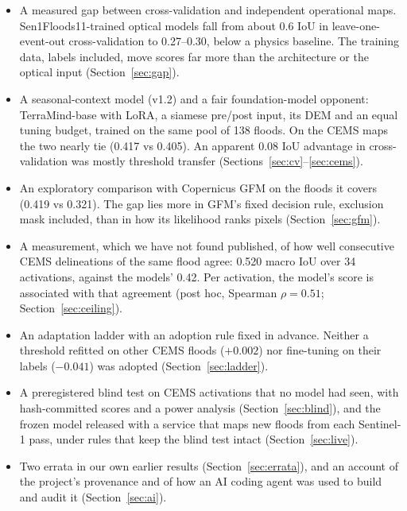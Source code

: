 \documentclass[10pt,twocolumn,a4paper]{article}
\begin{document}
\begin{itemize}
  \item A measured gap between cross-validation and independent operational maps. Sen1Floods11-trained optical models
    fall from about 0.6 IoU in leave-one-event-out cross-validation to 0.27--0.30, below a physics baseline. The
    training data, labels included, move scores far more than the architecture or the optical input
    (Section~\ref{sec:gap}).
  \item A seasonal-context model (v1.2) and a fair foundation-model opponent: TerraMind-base with LoRA, a siamese
    pre/post input, its DEM and an equal tuning budget, trained on the same pool of 138 floods. On the CEMS maps the two
    nearly tie (0.417 vs 0.405). An apparent 0.08 IoU advantage in cross-validation was mostly threshold transfer
    (Sections~\ref{sec:cv}--\ref{sec:cems}).
  \item An exploratory comparison with Copernicus GFM on the floods it covers (0.419 vs 0.321). The gap lies more in
    GFM's fixed decision rule, exclusion mask included, than in how its likelihood ranks pixels
    (Section~\ref{sec:gfm}).
  \item A measurement, which we have not found published, of how well consecutive CEMS delineations of the same
    flood agree: 0.520 macro IoU over 34 activations, against the models' 0.42. Per activation, the model's score is
    associated with that agreement (post hoc, Spearman $\rho = 0.51$; Section~\ref{sec:ceiling}).
  \item An adaptation ladder with an adoption rule fixed in advance. Neither a threshold refitted on other CEMS floods
    ($+0.002$) nor fine-tuning on their labels ($-0.041$) was adopted (Section~\ref{sec:ladder}).
  \item A preregistered blind test on CEMS activations that no model had seen, with hash-committed scores and a power
    analysis (Section~\ref{sec:blind}), and the frozen model released with a service that maps new floods from each
    Sentinel-1 pass, under rules that keep the blind test intact (Section~\ref{sec:live}).
  \item Two errata in our own earlier results (Section~\ref{sec:errata}), and an account of the project's provenance
    and of how an AI coding agent was used to build and audit it (Section~\ref{sec:ai}).
\end{itemize}

\end{document}
